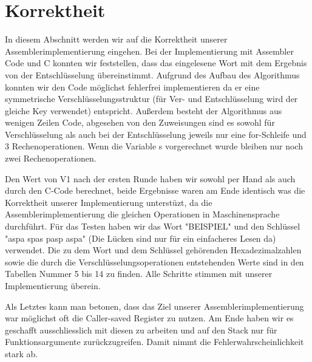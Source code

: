 \documentclass[course=asp]{aspdoc}
\begin{document}
\newpage
\section{Korrektheit}
In diesem Abschnitt werden wir auf die Korrektheit unserer Assemblerimplementierung eingehen. Bei der Implementierung mit Assembler Code und C konnten wir feststellen, dass das eingelesene Wort mit dem Ergebnis von der Entschlüsselung übereinstimmt. Aufgrund des Aufbau des Algorithmus konnten wir den Code möglichst fehlerfrei implementieren da er eine symmetrische Verschlüsselungsstruktur (für Ver- und Entschlüsselung wird der gleiche Key verwendet) entspricht. Außerdem besteht der Algorithmus aus wenigen Zeilen Code, abgesehen von den Zuweisungen sind es sowohl für Verschlüsselung als auch bei der Entschlüsselung jeweils nur eine for-Schleife und 3 Rechenoperationen. Wenn die Variable s vorgerechnet wurde
bleiben nur noch zwei Rechenoperationen.

Den Wert von V1 nach der ersten Runde haben wir sowohl per Hand als auch durch den C-Code berechnet, beide Ergebnisse waren am Ende identisch was die Korrektheit unserer Implementierung unterstüzt, da die Assemblerimplementierung die gleichen Operationen in Maschinensprache durchführt. Für das Testen haben wir das Wort "BEISPIEL" und den Schlüssel "aspa spas pasp aspa" (Die Lücken sind nur für ein einfacheres Lesen da)
verwendet. Die zu dem Wort und dem Schlüssel gehörenden Hexadezimalzahlen sowie die durch die Verschlüsselungsoperationen entstehenden Werte sind in den Tabellen Nummer 5 bis 14 zu finden. Alle Schritte stimmen mit unserer Implementierung überein.

Als Letztes kann man betonen, dass das Ziel unserer Assemblerimplementierung war möglichst oft die Caller-saved Register zu nutzen.  Am Ende haben wir es geschafft ausschliesslich mit diesen zu arbeiten und auf den Stack nur für Funktionsargumente zurückzugreifen. Damit nimmt die Fehlerwahrscheinlichkeit stark ab.
\newpage
\end{document}
